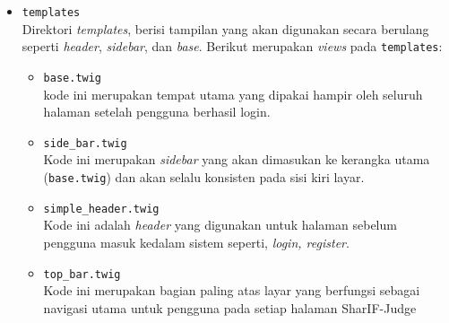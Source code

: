 \begin{itemize}
	      \begin{itemize}
		      \item \verb|error_404| \\
            Kode ini merupakan tampilan yang akan tampil ke pengguna ketika pengguna mencoba mengakses alamat yang tidak ada didalam sistem.
		      \item \verb|error_db| \\
            Kode ini merupakan tampilan halam ketika terjadi kegagalan dalam bagian database seperti gagal terhubung kedatabase atau data tidak ditemukan pada database.
		      \item \verb|error_exception| \\
            Kode ini menampilkan peringkatan ketika terjadi kesalahan.
		      \item \verb|error_general| \\
            Kode menampilkan kesalahan pada sistem atau \textit{framework} yang tidak masuk kedalam error 404 ataupun error database.
		      \item \verb|error_php| \\
            Kode ini berfungsi untuk menampilkan kotak peringatan berwarna merah ketika terjadi kesalahan sintaks atau \textit{runtime}.
	      \end{itemize}

	\item \verb|templates| \\
	    	Direktori \textit{templates}, berisi tampilan yang akan digunakan secara berulang seperti \textit{header}, \textit{sidebar}, dan \textit{base}. Berikut merupakan \textit{views} pada \verb|templates|:

	      \begin{itemize}
		      \item \verb|base.twig| \\
            kode ini merupakan tempat utama yang dipakai hampir oleh seluruh halaman setelah pengguna berhasil login.
		      \item \verb|side_bar.twig| \\
            Kode ini merupakan \textit{sidebar} yang akan dimasukan ke kerangka utama (\verb|base.twig|) dan akan selalu konsisten pada sisi kiri layar.
		      \item \verb|simple_header.twig| \\
            Kode ini adalah \textit{header} yang digunakan untuk halaman sebelum pengguna masuk kedalam sistem seperti, \textit{login, register}.
		      \item \verb|top_bar.twig| \\
            Kode ini merupakan bagian paling atas layar yang berfungsi sebagai navigasi utama untuk pengguna pada setiap halaman SharIF-Judge
	      \end{itemize}



\end{itemize}
